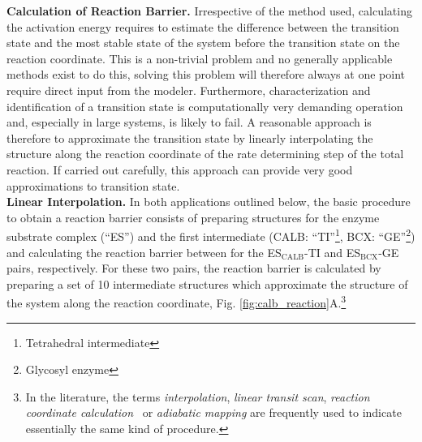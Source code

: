 \textbf{Calculation of Reaction Barrier.}
Irrespective of the method used, calculating the activation energy requires to estimate the difference between the transition state and the most stable state of the system before the transition state on the reaction coordinate.
This is a non-trivial problem and no generally applicable methods exist to do this, solving this problem will therefore always at one point require direct input from the modeler.
Furthermore, characterization and identification of a transition state is computationally very demanding operation and, especially in large systems, is likely to fail.
A reasonable approach is therefore to approximate the transition state by linearly interpolating the structure along the reaction coordinate of the rate determining step of the total reaction.
If carried out carefully, this approach can provide very good approximations to transition state.\\
\textbf{Linear Interpolation.}
In both applications outlined below, the basic procedure to obtain a reaction barrier consists of preparing structures for the enzyme substrate complex (``ES'') and the first intermediate (CALB: ``TI''\footnote{Tetrahedral intermediate}, BCX: ``GE''\footnote{\label{foot:ge}Glycosyl enzyme}) and calculating the reaction barrier between for the ES$_\text{CALB}$-TI and ES$_\text{BCX}$-GE pairs, respectively.
For these two pairs, the reaction barrier is calculated by preparing a set of 10 intermediate structures which approximate the structure of the system along the reaction coordinate, Fig. \ref{fig:calb_reaction}A.\footnote{In the literature, the terms \textit{interpolation}, \textit{linear transit scan}, \textit{reaction coordinate calculation } or \textit{adiabatic mapping} are frequently used to indicate essentially the same kind of procedure.}
